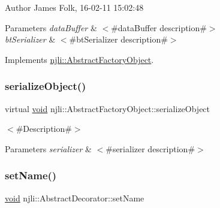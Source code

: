 \begin{DoxyAuthor}{Author}
James Folk, 16-\/02-\/11 15\+:02\+:48
\end{DoxyAuthor}

\begin{DoxyParams}{Parameters}
{\em data\+Buffer} & $<$\#data\+Buffer description\#$>$ \\
\hline
{\em bt\+Serializer} & $<$\#bt\+Serializer description\#$>$ \\
\hline
\end{DoxyParams}


Implements \mbox{\hyperlink{classnjli_1_1_abstract_factory_object_aad2fbe86fb3bdecf02918a96b9c57976}{njli\+::\+Abstract\+Factory\+Object}}.

\mbox{\label{classnjli_1_1_physics_close_contact_a4fc4bcd9d1930911474210c047372fc0}} 
\subsubsection{\texorpdfstring{serialize\+Object()}{serializeObject()}}
{\footnotesize\ttfamily virtual \mbox{\hyperlink{_thread_8h_af1e856da2e658414cb2456cb6f7ebc66}{void}} njli\+::\+Abstract\+Factory\+Object\+::serialize\+Object}

$<$\#\+Description\#$>$


\begin{DoxyParams}{Parameters}
{\em serializer} & $<$\#serializer description\#$>$ \\
\hline
\end{DoxyParams}
\mbox{\label{classnjli_1_1_physics_close_contact_a087eb5f8d9f51cc476f12f1d10a3cb95}} 
\subsubsection{\texorpdfstring{set\+Name()}{setName()}}
{\footnotesize\ttfamily \mbox{\hyperlink{_thread_8h_af1e856da2e658414cb2456cb6f7ebc66}{void}} njli\+::\+Abstract\+Decorator\+::set\+Name}

